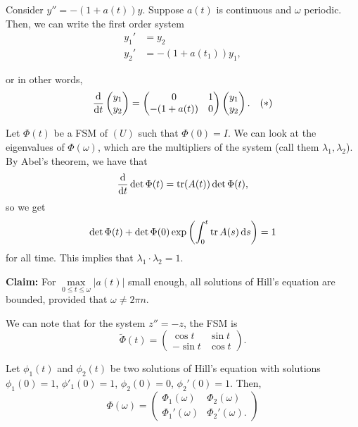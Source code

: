 \documentclass{article}
\begin{document}
\begin{example}{}
    Consider $y'' = -(1 + a(t))y$. Suppose $a(t)$ is continuous and $\omega$ periodic. Then, we can write the first order system
    \begin{align*}
        y_1' &= y_2 \\
        y_2' &= -(1 + a(t_1))y_1,
    \end{align*}

    or in other words,
    \[
        \dv{t} \begin{pmatrix} y_1 \\y_2 \end{pmatrix} = \begin{pmatrix} 0 & 1 \\ -(1 + a(t)) & 0 \end{pmatrix} \begin{pmatrix} y_1 \\ y_2 \end{pmatrix}. \quad (*)
    \]

    Let $\Phi(t)$ be a FSM of $(U)$ such that $\Phi(0) = I$. We can look at the eigenvalues of $\Phi(\omega)$, which are the multipliers of the system (call them $\lambda_1, \lambda_2$). By Abel's theorem, we have that 
    \[
        \dv{t} \det \Phi(t) = \tr(A(t)) \det \Phi(t),
    \] 
    so we get 
    \[
        \det \Phi(t) + \det \Phi(0) \exp \left(\int_0^t \tr A(s) \, \text{d} s \right) = 1
    \]
    for all time. This implies that $\lambda_1 \cdot \lambda_2 = 1$. 
    \newpar

    \textbf{Claim:} For $\max\limits_{0 \leq t \leq \omega} |a(t)|$ small enough, all solutions of Hill's equation are bounded, provided that $\omega \neq 2\pi n$.
    \newpar

    We can note that for the system $z'' = -z$, the FSM is
        \[
            \tilde \Phi(t) = 
            \begin{pmatrix}
                \cos t & \sin t \\
                -\sin t & \cos t
            \end{pmatrix}.
        \] 

    Let $\phi_1(t)$ and $\phi_2(t)$ be two solutions of Hill's equation with solutions $\phi_1(0) = 1$, $\phi'_1(0) = 1$, $\phi_2(0) = 0$, $\phi_2'(0) = 1$. Then, 
    \[
        \Phi(\omega) = 
        \begin{pmatrix}
            \Phi_1(\omega) & \Phi_2(\omega) \\
            \Phi_1'(\omega) & \Phi_2'(\omega).
        \end{pmatrix}
    \] 


\end{example}
\end{document}
